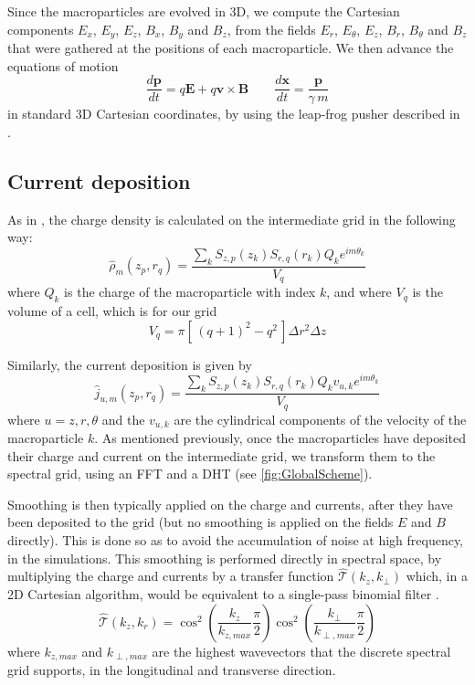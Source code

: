 \documentclass[1p,times,authoryear]{elsarticle}
\renewcommand{\vec}[1]{\boldsymbol{#1}}
\newcommand{\spectral}[1]{\hat{\mathcal{#1}}}
\begin{document}
Since the macroparticles are evolved in 3D, we compute
the Cartesian components $E_x$, $E_y$, $E_z$, $B_x$, $B_y$ and
$B_z$, from the fields $E_r$, $E_\theta$, $E_z$, $B_r$, $B_\theta$ and
$B_z$ that were gathered at the positions of each macroparticle. 
We then advance the equations of motion
\[ \frac{d\vec{p}}{dt} = q\vec{E} + q\vec{v}\times \vec{B} \qquad
\frac{d\vec{x}}{dt} = \frac{\vec{p}}{\gamma \,m} \]
\noindent  in standard 3D Cartesian coordinates, by using the leap-frog pusher described in \citep{VayPoP2008}.

\subsection{Current deposition}
\label{sec:current-deposition}

As in \citep{Lifschitz}, the charge density is calculated on the intermediate grid in the
following way:
\[ \hat{\rho}_m(z_p,r_q) = \frac{ \sum_k  S_{z,p}(z_k)S_{r,q}(r_k) Q_k e^{im\theta_k}}{V_{q}} \]
where $Q_k$ is the charge of the macroparticle with index $k$, and
where $V_q$ is the volume of a cell, which is for our grid
\[ V_{q} = \pi [\, (q+1)^2- q^2\,] \Delta r^2 \Delta z \]

\noindent Similarly, the current deposition is given by
\[ \hat{j}_{u,m}(z_p,r_q) = \frac{\sum_k S_{z,p}(z_k) S_{r,q}(r_k)
Q_k v_{u,k} e^{im\theta_k}}{V_{q}} \]
where $u = z,r,\theta$ and the $v_{u,k}$ are the cylindrical components of the
velocity of the macroparticle $k$. As mentioned previously, once the
macroparticles have deposited their charge and current on the
intermediate grid, we transform them to the spectral grid, using an
FFT and a DHT (see \cref{fig:GlobalScheme}).

Smoothing is then typically applied on the charge and currents, after they
have been deposited to the grid (but no smoothing is applied on the
fields $E$ and $B$ directly). This is done so as to avoid the accumulation
of noise at high frequency, in the simulations. This smoothing
is performed directly in spectral space, by multiplying the charge
and currents by a transfer function $\spectral{T}(k_z, k_\perp)$ which, 
in a 2D Cartesian algorithm, 
would be equivalent to a single-pass binomial filter \citep{Birdsall2004}.
\[ \spectral{T}(k_z, k_r) = \cos^2 \left( \frac{k_z}{k_{z,max}}\frac{\pi}{2} \right)
\cos^2\left( \frac{k_\perp}{k_{\perp,max}}\frac{\pi}{2} \right) \]
\noindent where $k_{z, max}$ and $k_{\perp,max}$ are the highest
wavevectors that the discrete spectral grid supports, in the
longitudinal and transverse direction.
\end{document}
